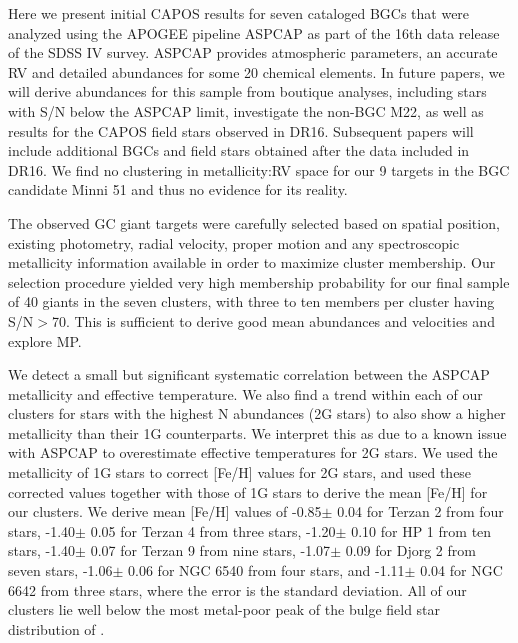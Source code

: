\documentclass[onecolumn]{aa}
\begin{document}
Here we present initial CAPOS results for seven cataloged BGCs that were analyzed using the APOGEE pipeline ASPCAP as part of the 16th data release of the SDSS IV survey. ASPCAP provides atmospheric parameters, an accurate RV  and detailed abundances for  some 20 chemical elements. In future papers, we will derive abundances for this sample from boutique analyses, including stars with S/N below the ASPCAP limit, investigate the non-BGC M22, as well as results for the CAPOS field stars observed in DR16.  Subsequent papers will include additional BGCs and field stars obtained after the data included in DR16. We find no clustering in metallicity:RV space for our 9 targets in the BGC candidate Minni 51 and thus no evidence for its reality.

The observed GC giant targets were carefully selected based on spatial position, existing photometry, radial velocity, proper motion
and any spectroscopic metallicity information available in order to maximize cluster membership. Our selection procedure yielded very high membership probability for our final sample of 40 giants in the seven clusters, with three to ten members per cluster having S/N$>$70. This is sufficient to derive good mean abundances and velocities and explore MP.

We detect a small but significant systematic correlation between the ASPCAP metallicity and effective temperature. We also find a trend within each of our clusters for stars with the highest N abundances (2G stars) to also show a higher metallicity than their 1G counterparts. We interpret this as due to a known issue with ASPCAP to overestimate effective temperatures for 2G stars. We used the metallicity of 1G stars to correct [Fe/H] values for 2G stars, and used these corrected values together with those of 1G stars to derive the mean [Fe/H] for our clusters. 
We derive mean [Fe/H] values of 
-0.85$\pm${ 0.04} for Terzan 2 from four stars, 
-1.40$\pm${ 0.05} for Terzan 4 from three stars, 
-1.20$\pm${ 0.10} for HP 1 from ten stars, 
-1.40$\pm${ 0.07} for Terzan 9 from nine stars, 
-1.07$\pm${ 0.09} for Djorg 2 from seven stars, 
-1.06$\pm${ 0.06} for NGC 6540 from four stars, and 
-1.11$\pm${ 0.04} for NGC 6642 from three stars, 
where the error is the standard deviation.
All of our clusters lie well below the most metal-poor peak of the bulge field star distribution of \citet{Rojas-Arriagada2020}.
\end{document}
